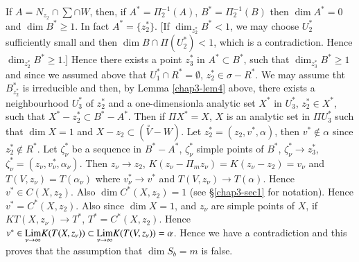 If $A=N_{z_{2}}\cap \sum \cap W$, then, if $A^{*}=\Pi^{-1}_{2}(A)$,
$B^{*}=\Pi^{-1}_{2}(B)$ then $\dim A^{*}=0$ and $\dim B^{*}\geq 1$. In
fact $A^{*}=\{z^{*}_{2}\}$. [If $\dim_{z^{*}_{2}}B^{*}<1$, we may
  choose $U^{*}_{2}$ sufficiently small and then $\dim B\cap
  \Pi(U^{*}_{2})<1$, which is a contradiction. Hence
  $\dim_{z^{*}_{2}}B^{*}\geq 1$.] Hence there exists a point
$z^{*}_{3}$ in $A^{*}\subset B^{*}$, such that
$\dim_{z^{*}_{3}}B^{*}\geq 1$ and since we assumed above that
$U^{*}_{1}\cap R^{*}=\emptyset$, $z^{*}_{2}\in \sigma-R^{*}$. We may
assume tht $B^{*}_{z^{*}_{2}}$ is irreducible and then, by Lemma
\ref{chap3-lem4} above, there exists a neighbourhood $U^{*}_{3}$ of
$z^{*}_{2}$ and a one-dimensionla analytic set $X^{*}$ in $U^{*}_{3}$,
$z^{*}_{2}\in X^{*}$, such that $X^{*}-z^{*}_{2}\subset
B^{*}-A^{*}$. Then if $\Pi X^{*}=X$, $X$ is an analytic set in $\Pi
U^{*}_{3}$ such that $\dim X=1$ and $X-z_{2}\subset
(\overset{\circ}{V}-W)$. Let $z^{*}_{2}=(z_{2},v^{*},\alpha)$, then
$v^{*}\not\in \alpha$ since $z^{*}_{2}\not\in R^{*}$. Let
$\zeta^{*}_{\nu}$ be a sequence in $B^{*}-A^{*}$, $\zeta^{*}_{\nu}$
simple points of $B^{*}$, $\zeta^{*}_{\nu}\to z^{*}_{3}$,
$\zeta^{*}_{\nu}=(z_{\nu},v^{*}_{\nu},\alpha_{\nu})$. Then $z_{\nu}\to
z_{2}$, $K(z_{\nu}-\Pi_{m}z_{\nu})=K(z_{\nu}-z_{2})=v_{\nu}$ and
$T(V,z_{\nu})=T(\alpha_{\nu})$ where $v^{*}_{\nu}\to v^{*}$ and
$T(V,z_{\nu})\to T(\alpha)$. Hence $v^{*}\in C(X,z_{2})$. Also $\dim
C^{*}(X,z_{2})=1$ (see \S \ref{chap3-sec1} for notation). Hence
$v^{*}=C^{*}(X,z_{2})$. Also since $\dim X=1$, and $z_{\nu}$ are
simple points of $X$, if $KT(X,z_{\nu})\to T^{*}$,
$T^{*}=C^{*}(X,z_{2})$. Hence $v^{*}\in
{\displaystyle{\mathop{\operatorname{Lim}}_{\nu\to \infty}}} K(T(X,z_{\nu}))\subset
{\displaystyle{\mathop{\operatorname{Lim}}_{\nu\to
      \infty}}}K(T(V,z_{\nu}))=\alpha$. Hence we have a contradiction
and this proves that the assumption that $\dim S_{b}=m$ is false. 
